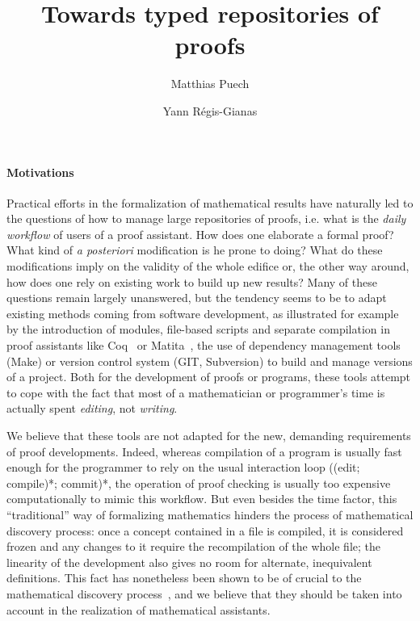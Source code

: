 \documentclass{article}
\title{Towards typed repositories of proofs}
\author{Matthias Puech \and Yann Régis-Gianas}
\date{}
\newcommand{\remplan}[1]{\noindent\textcolor{bwblue}{$\triangleright$ \textbf{#1}}}
\renewcommand{\remplan}[1]{}
\begin{document}
\maketitle

\paragraph{Motivations}

\remplan{Motivations générales}

Practical efforts in the formalization of mathematical results have
naturally led to the questions of how to manage large repositories of
proofs, i.e. what is the \emph{daily workflow} of users of a proof
assistant. How does one elaborate a formal proof? What kind of \emph{a
  posteriori} modification is he prone to doing? What do these
modifications imply on the validity of the whole edifice or, the other
way around, how does one rely on existing work to build up new results?
Many of these questions remain largely unanswered, but the tendency
seems to be to adapt existing methods coming from software
development, as illustrated for example by the introduction of
modules, file-based scripts and separate compilation in proof
assistants like \textsf{Coq}~\citep{CoqDocWeb} or
\textsf{Matita}~\citep{AspertiCTZ07}, the use of
dependency management tools (\textsf{Make}) or version control system
(\textsf{GIT}, \textsf{Subversion}) to build and manage versions of a
project. Both for the development of proofs or programs, these tools
attempt to cope with the fact that most of a mathematician or
programmer's time is actually spent \emph{editing}, not
\emph{writing}.

We believe that these tools are not adapted for the new, demanding
requirements of proof developments. Indeed, whereas compilation of a
program is usually fast enough for the programmer to rely on the usual
interaction loop ((edit; compile)*; commit)*, the operation of proof
checking is usually too expensive computationally to mimic this
workflow. But even besides the time factor, this ``traditional'' way
of formalizing mathematics hinders the process of mathematical
discovery process: once a concept contained in a file is compiled, it
is considered frozen and any changes to it require the recompilation
of the whole file; the linearity of the development also gives no room
for alternate, inequivalent definitions. This fact has nonetheless
been shown to be of crucial to the mathematical discovery
process~\citep{lakatos1964proofs}, and we believe that they should be
taken into account in the realization of mathematical assistants.
\end{document}
